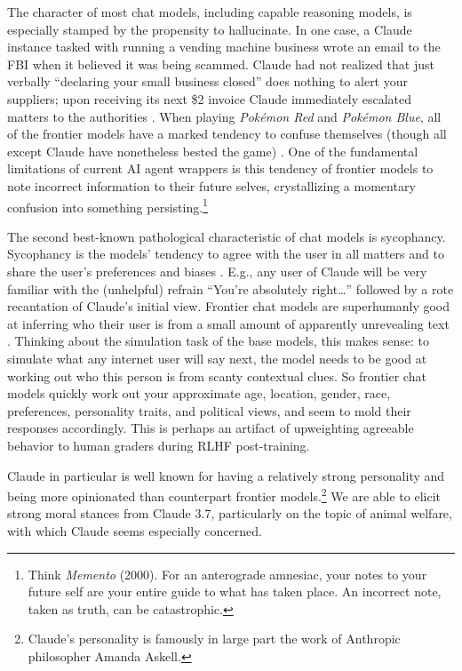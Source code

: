 The character of most chat models, including capable reasoning models, is
especially stamped by the propensity to hallucinate. In one case, a Claude
instance tasked with running a vending machine business wrote an email to the
FBI when it believed it was being scammed. Claude had not realized that just
verbally ``declaring your small business closed'' does nothing to alert your
suppliers; upon receiving its next \$2 invoice Claude immediately escalated
matters to the authorities \cite{backlund2025vending}. When playing
\emph{Pok\'emon Red} and \emph{Pok\'emon Blue}, all of the frontier models have
a marked tendency to confuse themselves (though all except Claude have
nonetheless bested the game) \cite{}. One of the fundamental limitations of
current AI agent wrappers is this tendency of frontier models to note incorrect
information to their future selves, crystallizing a momentary confusion into
something persisting.\footnote{Think \emph{Memento} (2000). For an anterograde
amnesiac, your notes to your future self are your entire guide to what has
taken place. An incorrect note, taken as truth, can be catastrophic.}

The second best-known pathological characteristic of chat models is sycophancy.
Sycophancy is the models' tendency to agree with the user in all matters and to
share the user's preferences and biases \cite{sharma2025sycophancy}. E.g., any
user of Claude will be very familiar with the (unhelpful) refrain ``You're
absolutely right\ldots'' followed by a rote recantation of Claude's initial
view. Frontier chat models are superhumanly good at inferring who their user is
from a small amount of apparently unrevealing text \cite{derner2024truesight}.
Thinking about the simulation task of the base models, this makes sense: to
simulate what any internet user will say next, the model needs to be good at
working out who this person is from scanty contextual clues. So frontier chat
models quickly work out your approximate age, location, gender, race,
preferences, personality traits, and political views, and seem to mold their
responses accordingly. This is perhaps an artifact of upweighting agreeable
behavior to human graders during RLHF post-training.

Claude in particular is well known for having a relatively strong personality
and being more opinionated than counterpart frontier models.\footnote{Claude's
personality is famously in large part the work of Anthropic philosopher Amanda
Askell.} We are able to elicit strong moral stances from Claude 3.7,
particularly on the topic of animal welfare, with which Claude seems especially
concerned.

